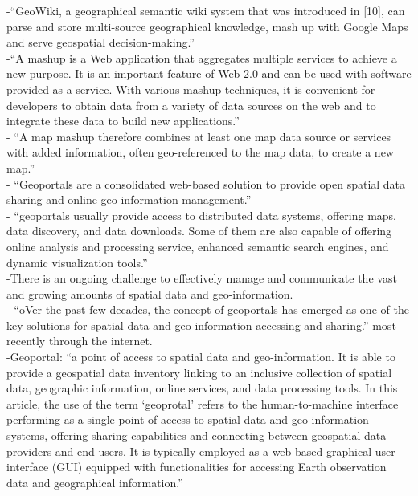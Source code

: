 -{\color{orange}“GeoWiki, a geographical semantic wiki system that was introduced in [10], can parse and store multi-source geographical knowledge, mash up with Google Maps and serve geospatial decision-making.”}\cite{Xing2015}\\
-{\color{orange}“A mashup is a Web application that aggregates multiple services to achieve a new purpose. It is an important feature of Web 2.0 and can be used with software provided as a service. With various mashup techniques, it is convenient for developers to obtain data from a variety of data sources on the web and to integrate these data to build new applications.” }\cite{Xing2015}\\
-{\color{orange} “A map mashup therefore combines at least one map data source or services with added information, often geo-referenced to the map data, to create a new map.”}\cite{Xing2015}\\
-{\color{orange} “Geoportals are a consolidated web-based solution to provide open spatial data sharing and online geo-information management.”}\cite{Jiang2020}\\
-{\color{orange} “geoportals usually provide access to distributed data systems, offering maps, data discovery, and data downloads. Some of them are also capable of offering online analysis and processing service, enhanced semantic search engines, and dynamic visualization tools.'' \cite{Jiang2020}}\\
-{\color{orange}There is an ongoing challenge to effectively manage and communicate the vast and growing amounts of spatial data and geo-information. \cite{Jiang2020}}\\
-{\color{orange} “oVer the past few decades, the concept of geoportals has emerged as one of the key solutions for spatial data and geo-information accessing and sharing.” most recently through the internet. \cite{Jiang2020}}\\
-{\color{orange}Geoportal: “a point of access to spatial data and geo-information. It is able to provide a geospatial data inventory linking to an inclusive collection of spatial data, geographic information, online services, and data processing tools. In this article, the use of the term ‘geoprotal’ refers to the human-to-machine interface performing as a single point-of-access to spatial data and geo-information systems, offering sharing capabilities and connecting between geospatial data providers and end users. It is typically employed as a web-based graphical user interface (GUI) equipped with functionalities for accessing Earth observation data and geographical information.”\cite{Jiang2020}}\\
